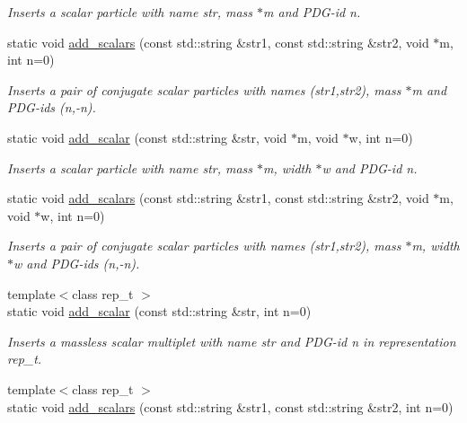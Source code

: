 \begin{DoxyCompactItemize}
\begin{DoxyCompactList}\small\item\em Inserts a scalar particle with name str, mass $\ast$m and P\-D\-G-\/id n. \end{DoxyCompactList}\item 
\hypertarget{a00370_ae9c3e377abcb541b43a3e45b53b5f627}{static void \hyperlink{a00370_ae9c3e377abcb541b43a3e45b53b5f627}{add\-\_\-scalars} (const std\-::string \&str1, const std\-::string \&str2, void $\ast$m, int n=0)}\label{a00370_ae9c3e377abcb541b43a3e45b53b5f627}

\begin{DoxyCompactList}\small\item\em Inserts a pair of conjugate scalar particles with names (str1,str2), mass $\ast$m and P\-D\-G-\/ids (n,-\/n). \end{DoxyCompactList}\item 
\hypertarget{a00370_a1db50ccce26c6d65aad150720cf45161}{static void \hyperlink{a00370_a1db50ccce26c6d65aad150720cf45161}{add\-\_\-scalar} (const std\-::string \&str, void $\ast$m, void $\ast$w, int n=0)}\label{a00370_a1db50ccce26c6d65aad150720cf45161}

\begin{DoxyCompactList}\small\item\em Inserts a scalar particle with name str, mass $\ast$m, width $\ast$w and P\-D\-G-\/id n. \end{DoxyCompactList}\item 
\hypertarget{a00370_aee7b9562b32be5e4dffbee9071fe750f}{static void \hyperlink{a00370_aee7b9562b32be5e4dffbee9071fe750f}{add\-\_\-scalars} (const std\-::string \&str1, const std\-::string \&str2, void $\ast$m, void $\ast$w, int n=0)}\label{a00370_aee7b9562b32be5e4dffbee9071fe750f}

\begin{DoxyCompactList}\small\item\em Inserts a pair of conjugate scalar particles with names (str1,str2), mass $\ast$m, width $\ast$w and P\-D\-G-\/ids (n,-\/n). \end{DoxyCompactList}\item 
\hypertarget{a00370_a029e8bbd411f974616ef7e1220d9e9f0}{{\footnotesize template$<$class rep\-\_\-t $>$ }\\static void \hyperlink{a00370_a029e8bbd411f974616ef7e1220d9e9f0}{add\-\_\-scalar} (const std\-::string \&str, int n=0)}\label{a00370_a029e8bbd411f974616ef7e1220d9e9f0}

\begin{DoxyCompactList}\small\item\em Inserts a massless scalar multiplet with name str and P\-D\-G-\/id n in representation rep\-\_\-t. \end{DoxyCompactList}\item 
\hypertarget{a00370_a3054d815cf3a749525291aaed0f5d5dd}{{\footnotesize template$<$class rep\-\_\-t $>$ }\\static void \hyperlink{a00370_a3054d815cf3a749525291aaed0f5d5dd}{add\-\_\-scalars} (const std\-::string \&str1, const std\-::string \&str2, int n=0)}\label{a00370_a3054d815cf3a749525291aaed0f5d5dd}


\end{DoxyCompactItemize}
